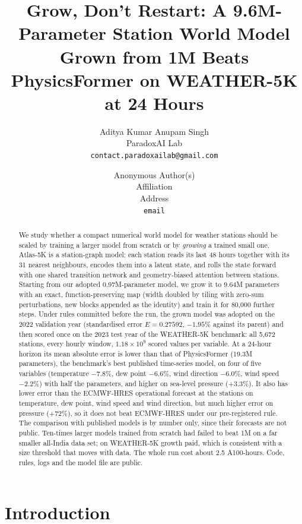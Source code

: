\documentclass{article}
\title{Grow, Don't Restart: A 9.6M-Parameter Station World Model Grown from 1M Beats PhysicsFormer on WEATHER-5K at 24 Hours}
\author{%
  Aditya Kumar \qquad Anupam Singh\\
  ParadoxAI Lab\\
  \texttt{contact.paradoxailab@gmail.com}
}
\author{Anonymous Author(s)\\Affiliation\\Address\\\texttt{email}}
\begin{document}
\maketitle

\begin{abstract}
We study whether a compact numerical world model for weather stations should be scaled by training a larger model from
scratch or by \emph{growing} a trained small one. Atlas-5K is a station-graph model: each station reads its last 48 hours
together with its 31 nearest neighbours, encodes them into a latent state, and rolls the state forward with one shared
transition network and geometry-biased attention between stations. Starting from our adopted 0.97M-parameter model, we
grow it to 9.64M parameters with an exact, function-preserving map (width doubled by tiling with zero-sum perturbations,
new blocks appended as the identity) and train it for 80,000 further steps. Under rules committed before the run, the
grown model was adopted on the 2022 validation year (standardised error $E=0.27592$, $-1.95\%$ against its parent) and
then scored once on the 2023 test year of the WEATHER-5K benchmark: all 5,672 stations, every hourly window,
$1.18\times10^9$ scored values per variable. At a 24-hour horizon its mean absolute error is lower than that of
PhysicsFormer (19.3M parameters), the benchmark's best published time-series model, on four of five variables
(temperature $-7.8\%$, dew point $-6.6\%$, wind direction $-6.0\%$, wind speed $-2.2\%$) with half the parameters,
and higher on sea-level pressure ($+3.3\%$). It also has lower error than the ECMWF-HRES operational forecast at the
stations on temperature, dew point, wind speed and wind direction, but much higher error on pressure ($+72\%$), so it
does not beat ECMWF-HRES under our pre-registered rule. The comparison with published models is by number only, since
their forecasts are not public. Ten-times larger models trained from scratch had failed to beat 1M on a far smaller
all-India data set; on WEATHER-5K growth paid, which is consistent with a size threshold that moves with data. The
whole run cost about 2.5 A100-hours. Code, rules, logs and the model file are public.
\end{abstract}

\section{Introduction}
\end{document}
